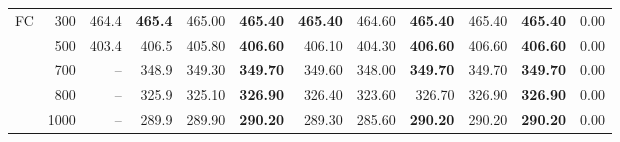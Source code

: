 \begin{table}[htbp]
{\begin{tabular}{lrrrrrrrrrrr}
\addlinespace[2pt]
FC & 300 & 464.4 & \textbf{465.4} & 465.00 & \textbf{465.40} & \textbf{465.40} & 464.60 & \textbf{465.40} & 465.40 & \textbf{465.40} & 0.00 \\
 & 500 & 403.4 & 406.5 & 405.80 & \textbf{406.60} & 406.10 & 404.30 & \textbf{406.60} & 406.60 & \textbf{406.60} & 0.00 \\
 & 700 & -- & 348.9 & 349.30 & \textbf{349.70} & 349.60 & 348.00 & \textbf{349.70} & 349.70 & \textbf{349.70} & 0.00 \\
 & 800 & -- & 325.9 & 325.10 & \textbf{326.90} & 326.40 & 323.60 & 326.70 & 326.90 & \textbf{326.90} & 0.00 \\
 & 1000 & -- & 289.9 & 289.90 & \textbf{290.20} & 289.30 & 285.60 & \textbf{290.20} & 290.20 & \textbf{290.20} & 0.00 \\
\bottomrule
\end{tabular}}
\end{table}

